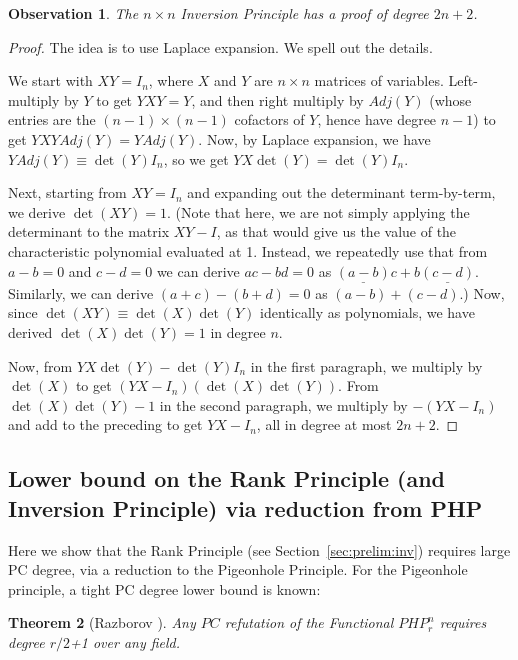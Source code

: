 \documentclass[10pt,a4paper]{article}
\newtheorem{theorem}{Theorem}[section]
\newtheorem{observation}[theorem]{Observation}
\theoremstyle{definition}
\begin{document}
\begin{observation}
The $n \times n$ Inversion Principle has a proof of degree $2n+2$.
\end{observation}

\begin{proof}
The idea is to use Laplace expansion. We spell out the details.

We start with $XY = I_n$, where $X$ and $Y$ are $n \times n$ matrices of variables. Left-multiply by $Y$ to get $YXY = Y$, and then right multiply by $Adj(Y)$ (whose entries are the $(n-1) \times (n-1)$ cofactors of $Y$, hence have degree $n-1$) to get $YXYAdj(Y) = YAdj(Y)$. Now, by Laplace expansion, we have $Y Adj(Y) \equiv \det(Y) I_n$, so we get $YX \det(Y) = \det(Y) I_n$.

Next, starting from $XY=I_n$ and expanding out the determinant term-by-term, we derive $\det(XY) = 1$. (Note that here, we are not simply applying the determinant to the matrix $XY-I$, as that would give us the value of the characteristic polynomial evaluated at 1. Instead, we repeatedly use that from $a-b=0$ and $c-d=0$ we can derive $ac-bd=0$ as $\underline{(a-b)}c + b\underline{(c-d)}$. Similarly, we can derive $(a+c)-(b+d)=0$ as $(a-b) + (c-d)$.) Now, since $\det(XY) \equiv \det(X)\det(Y)$ identically as polynomials, we have derived $\det(X)\det(Y)=1$ in degree $n$.

Now, from $YX \det(Y) - \det(Y) I_n$ in the first paragraph, we multiply by $\det(X)$ to get $(YX - I_n)(\det(X)\det(Y))$. From $\det(X)\det(Y)-1$ in the second paragraph, we multiply by $-(YX-I_n)$ and add to the preceding to get $YX - I_n$, all in degree at most $2n+2$.
\end{proof}


\subsection{Lower bound on the Rank Principle (and Inversion Principle) via reduction from PHP}
\newcommand{\bbI}{\mathbb{I}}

Here we show that the Rank Principle (see Section~\ref{sec:prelim:inv}) requires large PC degree, via a reduction to the Pigeonhole Principle. 
For the Pigeonhole principle, a tight PC degree lower bound is known:


\begin{theorem}[{Razborov \cite{DBLP:journals/cc/Razborov98}}]
\label{thm:PCdeglb}
Any $PC$ refutation of the Functional $PHP^n_r$ requires degree $r/2$+1 over any field.
\end{theorem}
\end{document}
